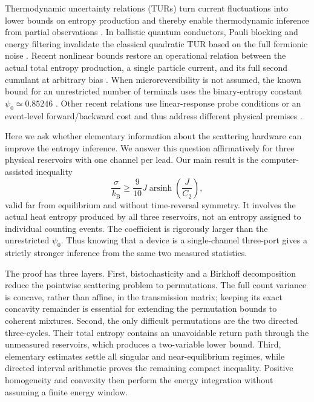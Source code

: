 \documentclass[aps,pra,reprint,superscriptaddress,nofootinbib,longbibliography,floatfix]{revtex4-2}
\newcommand{\kb}{k_{\mathrm B}}
\newcommand{\asinh}{\operatorname{arsinh}}
\begin{document}
Thermodynamic uncertainty relations (TURs) turn current fluctuations into lower bounds on entropy production and thereby enable thermodynamic inference from partial observations \cite{BaratoSeifert2015,Gingrich2016}.  In ballistic quantum conductors, Pauli blocking and energy filtering invalidate the classical quadratic TUR based on the full fermionic noise \cite{BrandnerHanazatoSaito2018}.  Recent nonlinear bounds restore an operational relation between the actual total entropy production, a single particle current, and its full second cumulant at arbitrary bias \cite{Potanina2021,BrandnerSaito2025,BrandnerSaito2025JPA}.  When microreversibility is not assumed, the known bound for an unrestricted number of terminals uses the binary-entropy constant $\psi_0\simeq0.85246$ \cite{BrandnerSaito2025}.  Other recent relations use linear-response probe conditions or an event-level forward/backward cost and thus address different physical premises \cite{Zhang2026,Tesser2026}.

Here we ask whether elementary information about the scattering hardware can improve the entropy inference.  We answer this question affirmatively for three physical reservoirs with one channel per lead.  Our main result is the computer-assisted inequality
\begin{equation}
 \frac{\sigma}{\kb}\geq \frac{9}{10}J\asinh\!\left(\frac{J}{C_2}\right),
 \label{eq:main}
\end{equation}
valid far from equilibrium and without time-reversal symmetry.  It involves the actual heat entropy produced by all three reservoirs, not an entropy assigned to individual counting events.  The coefficient is rigorously larger than the unrestricted $\psi_0$.  Thus knowing that a device is a single-channel three-port gives a strictly stronger inference from the same two measured statistics.

The proof has three layers.  First, bistochasticity and a Birkhoff decomposition reduce the pointwise scattering problem to permutations.  The full count variance is concave, rather than affine, in the transmission matrix; keeping its exact concavity remainder is essential for extending the permutation bounds to coherent mixtures.  Second, the only difficult permutations are the two directed three-cycles.  Their total entropy contains an unavoidable return path through the unmeasured reservoirs, which produces a two-variable lower bound.  Third, elementary estimates settle all singular and near-equilibrium regimes, while directed interval arithmetic proves the remaining compact inequality.  Positive homogeneity and convexity then perform the energy integration without assuming a finite energy window.
\end{document}
